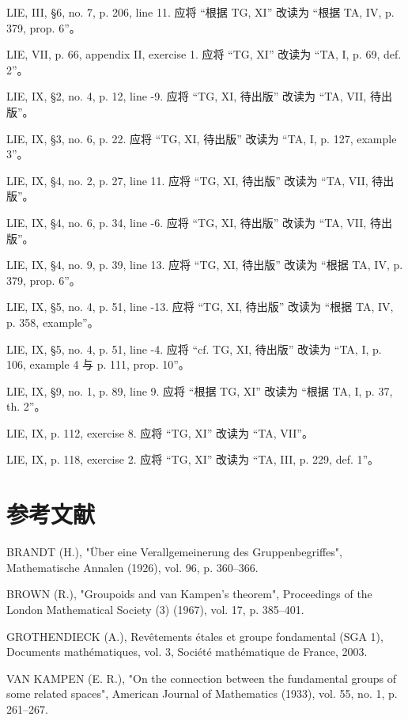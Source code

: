 \documentclass[UTF8,12pt,a4paper,oneside]{ctexbook}
\newcommand{\specialchapter}[1]{%
  \chapter*{#1}%
  \phantomsection
  \addcontentsline{toc}{chapter}{#1}%
}
\begin{document}
LIE, III, §6, no. 7, p. 206, line 11. 应将 “根据 TG, XI” 改读为 “根据 TA, IV, p. 379, prop. 6”。

LIE, VII, p. 66, appendix II, exercise 1. 应将 “TG, XI” 改读为 “TA, I, p. 69, def. 2”。

LIE, IX, §2, no. 4, p. 12, line -9. 应将 “TG, XI, 待出版” 改读为 “TA, VII, 待出版”。

LIE, IX, §3, no. 6, p. 22. 应将 “TG, XI, 待出版” 改读为 “TA, I, p. 127, example 3”。

LIE, IX, §4, no. 2, p. 27, line 11. 应将 “TG, XI, 待出版” 改读为 “TA, VII, 待出版”。

LIE, IX, §4, no. 6, p. 34, line -6. 应将 “TG, XI, 待出版” 改读为 “TA, VII, 待出版”。

LIE, IX, §4, no. 9, p. 39, line 13. 应将 “TG, XI, 待出版” 改读为 “根据 TA, IV, p. 379, prop. 6”。

LIE, IX, §5, no. 4, p. 51, line -13. 应将 “TG, XI, 待出版” 改读为 “根据 TA, IV, p. 358, example”。

LIE, IX, §5, no. 4, p. 51, line -4. 应将 “cf. TG, XI, 待出版” 改读为 “TA, I, p. 106, example 4 与 p. 111, prop. 10”。

LIE, IX, §9, no. 1, p. 89, line 9. 应将 “根据 TG, XI” 改读为 “根据 TA, I, p. 37, th. 2”。

LIE, IX, p. 112, exercise 8. 应将 “TG, XI” 改读为 “TA, VII”。

LIE, IX, p. 118, exercise 2. 应将 “TG, XI” 改读为 “TA, III, p. 229, def. 1”。

\specialchapter{参考文献}

BRANDT (H.), "Über eine Verallgemeinerung des Gruppenbegriffes", Mathematische Annalen (1926), vol. 96, p. 360--366.

BROWN (R.), "Groupoids and van Kampen's theorem", Proceedings of the London Mathematical Society (3) (1967), vol. 17, p. 385--401.

GROTHENDIECK (A.), Revêtements étales et groupe fondamental (SGA 1), Documents mathématiques, vol. 3, Société mathématique de France, 2003.

VAN KAMPEN (E. R.), "On the connection between the fundamental groups of some related spaces", American Journal of Mathematics (1933), vol. 55, no. 1, p. 261--267.
\end{document}
